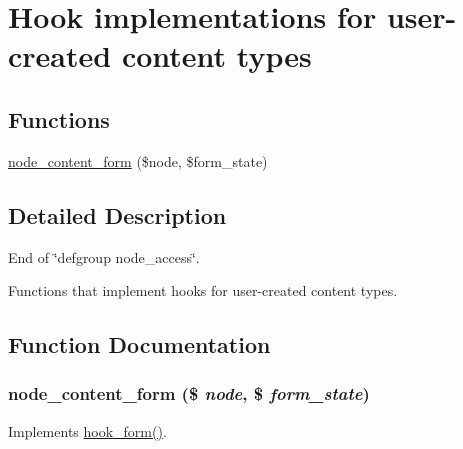 \hypertarget{group__node__content}{
\section{Hook implementations for user-\/created content types}
\label{group__node__content}
}
\subsection*{Functions}
\begin{DoxyCompactItemize}
\item 
\hyperlink{group__node__content_ga5f8f7253ba1bd773e4032546e9241983}{node\_\-content\_\-form} (\$node, \$form\_\-state)
\end{DoxyCompactItemize}


\subsection{Detailed Description}
End of \char`\"{}defgroup node\_\-access\char`\"{}.

Functions that implement hooks for user-\/created content types. 

\subsection{Function Documentation}
\hypertarget{group__node__content_ga5f8f7253ba1bd773e4032546e9241983}{
\subsubsection[{node\_\-content\_\-form}]{\setlength{\rightskip}{0pt plus 5cm}node\_\-content\_\-form (\$ {\em node}, \/  \$ {\em form\_\-state})}}
\label{group__node__content_ga5f8f7253ba1bd773e4032546e9241983}
Implements \hyperlink{group__node__api__hooks_ga52618ef4643a60878dd5a76ff9bbff30}{hook\_\-form()}. 